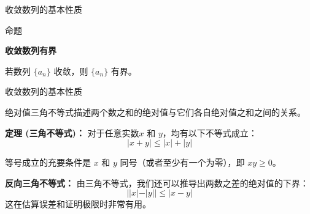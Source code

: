 \documentclass[aspectratio=169,10pt,fontset=fandol]{ctexbeamer}
\newenvironment{custom}[1]{\par\noindent\textbf{#1}\quad}{\par\vspace{0.8em}}
\begin{document}
\begin{frame}[t,fragile]{收敛数列的基本性质}
\normalsize
\begin{block}{命题}
{\normalsize
\textbf{收敛数列有界}\par

	若数列 $\{a_n\}$ 收敛，则 $\{a_n\}$ 有界。

}
\end{block}
\end{frame}
\begin{frame}[t,fragile]{收敛数列的基本性质}
\small
{\small
绝对值三角不等式描述两个数之和的绝对值与它们各自绝对值之和之间的关系。
	
	\textbf{定理 (三角不等式)：} 对于任意实数$x$ 和 $y$，均有以下不等式成立：
	\begin{equation*}
		|x + y| \le |x| + |y|
	\end{equation*}
	
	等号成立的充要条件是 $x$ 和 $y$ 同号（或者至少有一个为零），即 $xy \ge 0$。
	
	\textbf{反向三角不等式：} 由三角不等式，我们还可以推导出两数之差的绝对值的下界：
	\begin{equation*}
		||x| - |y|| \le |x - y|
	\end{equation*}
	这在估算误差和证明极限时非常有用。

}
\end{frame}
\end{document}
